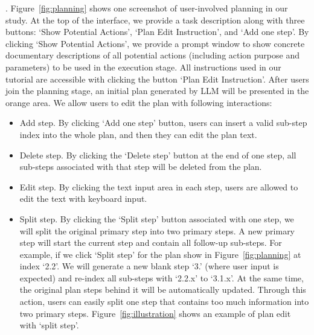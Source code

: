 . Figure~\ref{fig:planning} shows one screenshot of user-involved planning in our study. 
At the top of the interface, we provide a task description along with three buttons: `Show Potential Actions', `Plan Edit Instruction', and `Add one step'. 
By clicking `Show Potential Actions', we provide a prompt window to show concrete documentary descriptions of all potential actions (including action purpose and parameters) to be used in the execution stage. All instructions used in our tutorial are accessible with clicking the button `Plan Edit Instruction'. 
After users join the planning stage, an initial plan generated by LLM will be presented in the orange area. We allow users to edit the plan with following interactions:
\begin{itemize}
    \item Add step. By clicking `Add one step' button, users can insert a valid sub-step index into the whole plan, and then they can edit the plan text.
    \item Delete step. By clicking the `Delete step' button at the end of one step, all sub-steps associated with that step will be deleted from the plan.
    \item Edit step. By clicking the text input area in each step, users are allowed to edit the text with keyboard input.
    \item Split step. By clicking the `Split step' button associated with one step, we will split the original primary step into two primary steps. A new primary step will start the current step and contain all follow-up sub-steps. For example, if we click `Split step' for the plan show in Figure~\ref{fig:planning} at index `2.2'. We will generate a new blank step `3.' (where user input is expected) and re-index all sub-steps with `2.2.x' to `3.1.x'. At the same time, the original plan steps behind it will be automatically updated. Through this action, users can easily split one step that contains too much information into two primary steps. Figure~\ref{fig:illustration} shows an example of plan edit with `split step'.
\end{itemize}



